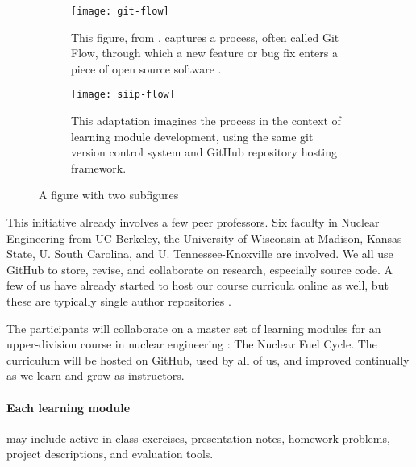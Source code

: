 \documentclass[11pt]{article}
\begin{document}
          \begin{figure}
                  \centering
                  \begin{subfigure}{.4\textwidth}
                            \centering
                              \texttt{[image: git-flow]}
        \caption{This figure, from \cite{scopatz_effective_2016}, captures a process, often called Git Flow, through which a new feature or bug fix enters a piece of open source software \cite{scopatz_effective_2016}.}
                                  \label{fig:sub1}
                  \end{subfigure}\hfill%
                  \begin{subfigure}{.4\textwidth}
                            \centering
                              \texttt{[image: siip-flow]}
  \caption{This adaptation imagines the process in the context of learning module development, using the same git version control system and GitHub repository hosting framework.}
                                  \label{fig:sub2}
                  \end{subfigure}
                  \caption{A figure with two subfigures}
                  \label{fig:test}
          \end{figure}


          This initiative already involves a few peer professors. Six faculty 
          in Nuclear Engineering from UC Berkeley, the University of Wisconsin 
          at Madison, Kansas State, U. South Carolina, and U. 
          Tennessee-Knoxville are involved. We all use GitHub \cite{github} to 
          store, revise, and collaborate on research, especially source code. A 
          few of us have already started to host our course curricula online as 
          well, but these are typically single author repositories 
          \cite{skutnik,wilson,slaybaugh,scopatz,borelli,roberts}.

          The participants will collaborate on a master set of learning 
          modules for an upper-division course in nuclear engineering : 
          The Nuclear Fuel Cycle.  The curriculum will be hosted on GitHub, 
          used by all of us, and improved continually as we learn and grow as 
          instructors. 

          \paragraph{Each learning module} may include active in-class exercises, 
          presentation notes, homework problems, project descriptions, and 
          evaluation tools. 
          
\end{document}
